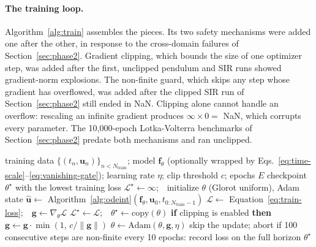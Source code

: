 \paragraph{The training loop.} Algorithm~\ref{alg:train} assembles the pieces.
Its two safety mechanisms were added one after the other, in response to the
cross-domain failures of Section~\ref{sec:phase2}. Gradient clipping, which
bounds the size of one optimizer step, was added after the first, unclipped
pendulum and SIR runs showed gradient-norm explosions. The non-finite guard,
which skips any step whose gradient has overflowed, was added after the
clipped SIR run of Section~\ref{sec:phase2} still ended in NaN. Clipping
alone cannot handle an overflow: rescaling an infinite gradient produces
$\infty\times0=$ NaN, which corrupts every parameter. The 10{,}000-epoch
Lotka-Volterra benchmarks of Section~\ref{sec:phase2} predate both
mechanisms and ran unclipped.

\begin{algorithm}[htbp]
\caption{Training loop (\texttt{train.py}) used for the benchmark runs; the
study-specific loops follow the same checkpoint-selection rule.}
\label{alg:train}
\begin{algorithmic}[1]
\Require training data $\{(t_n,\mathbf u_n)\}_{n<N_{\text{train}}}$; model $\mathbf f_\theta$ (optionally wrapped by Eqs.~\ref{eq:time-scale}--\ref{eq:vanishing-gate}); learning rate $\eta$; clip threshold $c$; epochs $E$
\Ensure checkpoint $\theta^{\star}$ with the lowest training loss
\State $\mathcal L^{\star}\gets\infty$;\ \ initialize $\theta$ (Glorot uniform), Adam state
  \State $\hat{\mathbf u}\gets$ Algorithm~\ref{alg:odeint}$(\mathbf f_\theta,\mathbf u_0,t_{0:N_{\text{train}}-1})$
  \State $\mathcal L\gets$ Equation~\ref{eq:train-loss};\ \ $\mathbf g\gets\nabla_\theta\mathcal L$ 
   \State $\mathcal L^{\star}\gets\mathcal L$;\ \ $\theta^{\star}\gets\mathrm{copy}(\theta)$ 
  \EndIf
    \State \textbf{if} clipping is enabled \textbf{then} $\mathbf g\gets\mathbf g\cdot\min(1,\,c/\lVert\mathbf g\rVert)$
    \State $\theta\gets\mathrm{Adam}(\theta,\mathbf g,\eta)$
  \Else
    \State skip the update; abort if 100 consecutive steps are non-finite
  \EndIf
  \State every 10 epochs: record loss on the full horizon 
\EndFor
\State \Return $\theta^{\star}$
\end{algorithmic}
\end{algorithm}

\FloatBarrier
